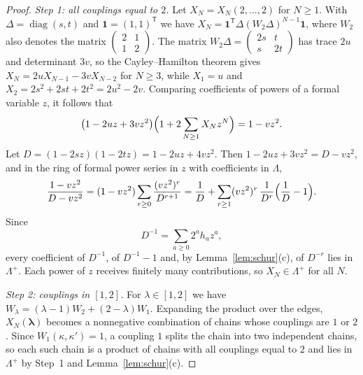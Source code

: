 \documentclass{amsart}
\theoremstyle{definition}
\theoremstyle{remark}
\numberwithin{equation}{section}
\newcommand{\one}{\mathbf{1}}
\newcommand{\Lp}{\Lambda^{+}}
\begin{document}
\begin{proof}
\emph{Step 1: all couplings equal to $2$.} Let $X_N=X_N(2,\dots,2)$ for $N\ge1$. With $\Delta=\operatorname{diag}(s,t)$ and $\one=(1,1)^{\mathsf T}$ we have $X_N=\one^{\mathsf T}\Delta(W_2\Delta)^{N-1}\one$, where $W_2$ also denotes the matrix $\left(\begin{smallmatrix}2&1\\1&2\end{smallmatrix}\right)$. The matrix $W_2\Delta=\left(\begin{smallmatrix}2s&t\\ s&2t\end{smallmatrix}\right)$ has trace $2u$ and determinant $3v$, so the Cayley--Hamilton theorem gives $X_N=2uX_{N-1}-3vX_{N-2}$ for $N\ge3$, while $X_1=u$ and $X_2=2s^2+2st+2t^2=2u^2-2v$. Comparing coefficients of powers of a formal variable $z$, it follows that
\[
\bigl(1-2uz+3vz^2\bigr)\Bigl(1+2\sum_{N\ge1}X_Nz^N\Bigr)=1-vz^2 .
\]
Let $D=(1-2sz)(1-2tz)=1-2uz+4vz^2$. Then $1-2uz+3vz^2=D-vz^2$, and in the ring of formal power series in $z$ with coefficients in $\Lambda$,
\[
\frac{1-vz^2}{D-vz^2}=(1-vz^2)\sum_{r\ge0}\frac{(vz^2)^r}{D^{r+1}}
=\frac1D+\sum_{r\ge1}(vz^2)^r\,\frac{1}{D^{r}}\Bigl(\frac1D-1\Bigr).
\]
Since
\[
D^{-1}=\sum_{a\ge0}2^ah_az^a,
\]
every coefficient of $D^{-1}$, of $D^{-1}-1$ and, by Lemma~\ref{lem:schur}(c), of $D^{-r}$ lies in $\Lp$. Each power of $z$ receives finitely many contributions, so $X_N\in\Lp$ for all $N$.

\emph{Step 2: couplings in $[1,2]$.} For $\lambda\in[1,2]$ we have $W_\lambda=(\lambda-1)W_2+(2-\lambda)W_1$. Expanding the product over the edges, $X_N(\boldsymbol\lambda)$ becomes a nonnegative combination of chains whose couplings are $1$ or $2$. Since $W_1(\kappa,\kappa')=1$, a coupling $1$ splits the chain into two independent chains, so each such chain is a product of chains with all couplings equal to $2$ and lies in $\Lp$ by Step~1 and Lemma~\ref{lem:schur}(c).


\end{proof}
\end{document}
